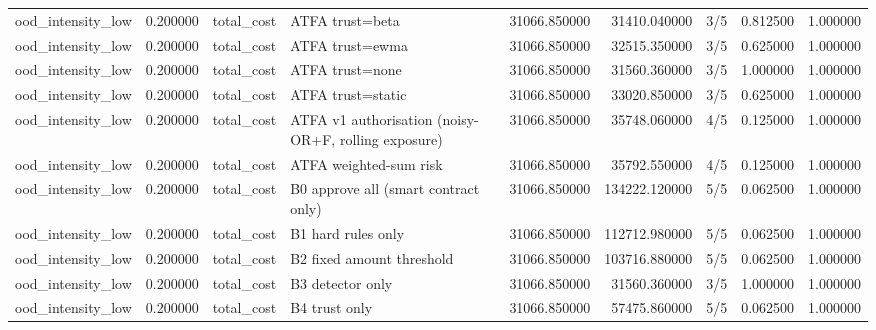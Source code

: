 \begin{tabular}{lrllrrlrr}
ood\_intensity\_low & 0.200000 & total\_cost & ATFA trust=beta & 31066.850000 & 31410.040000 & 3/5 & 0.812500 & 1.000000 \\
ood\_intensity\_low & 0.200000 & total\_cost & ATFA trust=ewma & 31066.850000 & 32515.350000 & 3/5 & 0.625000 & 1.000000 \\
ood\_intensity\_low & 0.200000 & total\_cost & ATFA trust=none & 31066.850000 & 31560.360000 & 3/5 & 1.000000 & 1.000000 \\
ood\_intensity\_low & 0.200000 & total\_cost & ATFA trust=static & 31066.850000 & 33020.850000 & 3/5 & 0.625000 & 1.000000 \\
ood\_intensity\_low & 0.200000 & total\_cost & ATFA v1 authorisation (noisy-OR+F, rolling exposure) & 31066.850000 & 35748.060000 & 4/5 & 0.125000 & 1.000000 \\
ood\_intensity\_low & 0.200000 & total\_cost & ATFA weighted-sum risk & 31066.850000 & 35792.550000 & 4/5 & 0.125000 & 1.000000 \\
ood\_intensity\_low & 0.200000 & total\_cost & B0 approve all (smart contract only) & 31066.850000 & 134222.120000 & 5/5 & 0.062500 & 1.000000 \\
ood\_intensity\_low & 0.200000 & total\_cost & B1 hard rules only & 31066.850000 & 112712.980000 & 5/5 & 0.062500 & 1.000000 \\
ood\_intensity\_low & 0.200000 & total\_cost & B2 fixed amount threshold & 31066.850000 & 103716.880000 & 5/5 & 0.062500 & 1.000000 \\
ood\_intensity\_low & 0.200000 & total\_cost & B3 detector only & 31066.850000 & 31560.360000 & 3/5 & 1.000000 & 1.000000 \\
ood\_intensity\_low & 0.200000 & total\_cost & B4 trust only & 31066.850000 & 57475.860000 & 5/5 & 0.062500 & 1.000000 \\
\bottomrule
\end{tabular}

